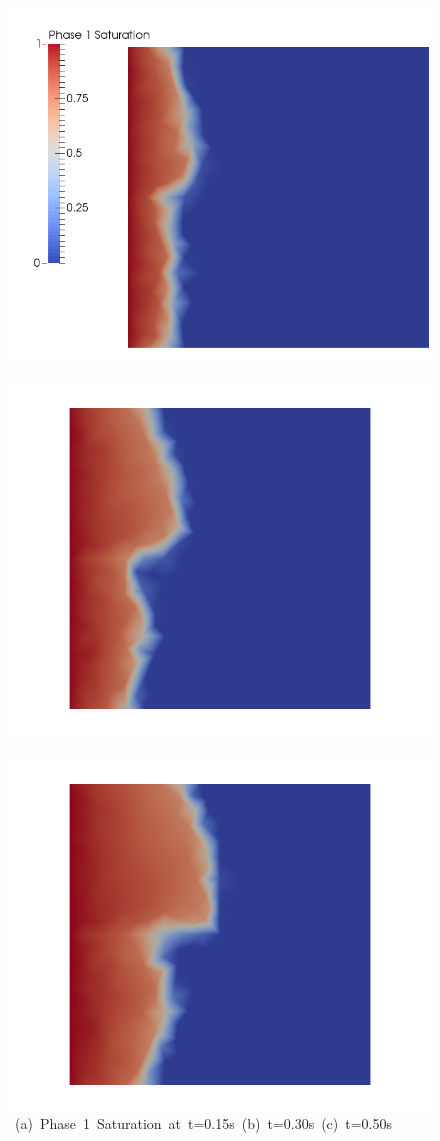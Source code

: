 \begin{landscape}
\begin{figure}[ht] 
\vbox{\vspace{-1cm}
\hspace{0.0cm} \hbox{\includegraphics[width=.56\textwidth]{./Pics/SVDCase/SVDCase_Saturation_t_dot15.png}
      \includegraphics[width=.56\textwidth]{./Pics/SVDCase/SVDCase_Saturation_t_dot30.png}
      \includegraphics[width=.56\textwidth]{./Pics/SVDCase/SVDCase_Saturation_t_dot50.png}}
\vspace{0.cm}
\hbox{\hspace{0.5cm} (a) Phase 1 Saturation at t=0.15s \hspace{3.75cm} (b) t=0.30s \hspace{5.0cm} (c) t=0.50s}
}
\end{figure}
\end{landscape}
